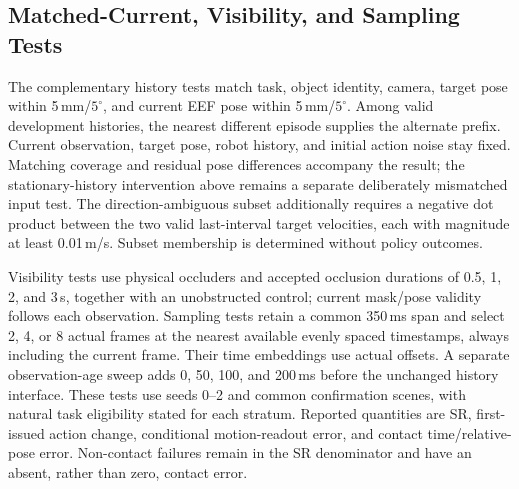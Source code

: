 \subsection{Matched-Current, Visibility, and Sampling Tests}
The complementary history tests match task, object identity, camera, target
pose within 5\,mm/$5^\circ$, and current EEF pose within 5\,mm/$5^\circ$.
Among valid development histories, the nearest different episode supplies
the alternate prefix. Current observation, target pose, robot history,
and initial action noise stay fixed. Matching coverage and residual pose
differences accompany the result; the stationary-history intervention above
remains a separate deliberately mismatched input test. The direction-ambiguous
subset additionally requires a negative dot product between the two valid
last-interval target velocities, each with magnitude at least 0.01\,m/s.
Subset membership is determined without policy outcomes.

Visibility tests use physical occluders and accepted occlusion durations
of 0.5, 1, 2, and 3\,s, together with an unobstructed control; current
mask/pose validity follows each observation. Sampling tests retain a common
350\,ms span and select 2, 4, or 8 actual frames at the nearest available
evenly spaced timestamps, always including the current frame. Their
time embeddings use actual offsets. A separate observation-age sweep
adds 0, 50, 100, and 200\,ms before the unchanged history interface.
These tests use seeds 0--2 and common confirmation scenes, with natural
task eligibility stated for each stratum. Reported quantities are SR,
first-issued action change, conditional motion-readout error, and contact
time/relative-pose error. Non-contact failures remain in the SR denominator
and have an absent, rather than zero, contact error.
